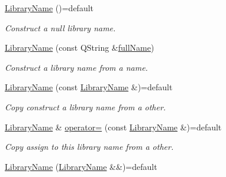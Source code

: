 \begin{DoxyCompactItemize}
\item 
\hyperlink{class_mdt_1_1_deploy_utils_1_1_library_name_a174f66647b7e49cd83c7354f72ba9404}{Library\+Name} ()=default\hypertarget{class_mdt_1_1_deploy_utils_1_1_library_name_a174f66647b7e49cd83c7354f72ba9404}{}\label{class_mdt_1_1_deploy_utils_1_1_library_name_a174f66647b7e49cd83c7354f72ba9404}

\begin{DoxyCompactList}\small\item\em Construct a null library name. \end{DoxyCompactList}\item 
\hyperlink{class_mdt_1_1_deploy_utils_1_1_library_name_a9179606c5c7fdd0f6e00d6c4d563aa00}{Library\+Name} (const Q\+String \&\hyperlink{class_mdt_1_1_deploy_utils_1_1_library_name_a2ca0dd90765abc0bd7082bc3f64da1c7}{full\+Name})
\begin{DoxyCompactList}\small\item\em Construct a library name from a name. \end{DoxyCompactList}\item 
\hyperlink{class_mdt_1_1_deploy_utils_1_1_library_name_a92d73ba6b45fce3ea7ea8979b795af1a}{Library\+Name} (const \hyperlink{class_mdt_1_1_deploy_utils_1_1_library_name}{Library\+Name} \&)=default\hypertarget{class_mdt_1_1_deploy_utils_1_1_library_name_a92d73ba6b45fce3ea7ea8979b795af1a}{}\label{class_mdt_1_1_deploy_utils_1_1_library_name_a92d73ba6b45fce3ea7ea8979b795af1a}

\begin{DoxyCompactList}\small\item\em Copy construct a library name from a other. \end{DoxyCompactList}\item 
\hyperlink{class_mdt_1_1_deploy_utils_1_1_library_name}{Library\+Name} \& \hyperlink{class_mdt_1_1_deploy_utils_1_1_library_name_adba93693bb7bb8bd5fc08881da9d5258}{operator=} (const \hyperlink{class_mdt_1_1_deploy_utils_1_1_library_name}{Library\+Name} \&)=default\hypertarget{class_mdt_1_1_deploy_utils_1_1_library_name_adba93693bb7bb8bd5fc08881da9d5258}{}\label{class_mdt_1_1_deploy_utils_1_1_library_name_adba93693bb7bb8bd5fc08881da9d5258}

\begin{DoxyCompactList}\small\item\em Copy assign to this library name from a other. \end{DoxyCompactList}\item 
\hyperlink{class_mdt_1_1_deploy_utils_1_1_library_name_a889abbf2405f93dfe07c260082512362}{Library\+Name} (\hyperlink{class_mdt_1_1_deploy_utils_1_1_library_name}{Library\+Name} \&\&)=default\hypertarget{class_mdt_1_1_deploy_utils_1_1_library_name_a889abbf2405f93dfe07c260082512362}{}\label{class_mdt_1_1_deploy_utils_1_1_library_name_a889abbf2405f93dfe07c260082512362}


\end{DoxyCompactItemize}
